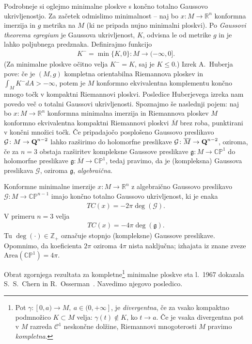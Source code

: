 \documentclass[12pt,a4paper,twoside]{article}
\theoremstyle{definition} %
\theoremstyle{plain} %
\numberwithin{equation}{section}  %
\newcommand{\R}{\mathbb R}
\newcommand{\Z}{\mathbb Z}
\begin{document}
Podrobneje si oglejmo minimalne ploskve s končno totalno Gaussovo ukrivljenostjo. Za začetek odmislimo minimalnost -- naj bo $x \colon M \to \R^{n}$ konformna imerzija in $g$ metrika na $M$ (ki ne pripada nujno minimalni ploskvi). Po \emph{Gaussovi theorema egregium} je Gaussova ukrivljenost, $K$, odvisna le od metrike $g$ in je lahko poljubnega predznaka. Definirajmo funkcijo
\begin{gather*}
K^{-} = \min \{K,0 \} \colon M \to (-\infty, 0].
\end{gather*}
(Za minimalne ploskve očitno velja $K^{-} = K$, saj je $K \leq 0$.)
%
Izrek A.~Huberja~\cite[Theorem~2.6.4]{alarcon2021minimal} pove: če je $(M,g)$ kompletna orientabilna Riemannova ploskev in $\int_{M} K^{-}dA > -\infty$, potem je $M$ konformno ekvivalentna komplementu končno mnogo točk v kompaktni Riemannovi ploskvi. \newline
Posledice Huberjevega izreka nam povedo več o totalni Gaussovi ukrivljenosti.
Spoznajmo še naslednji pojem: naj bo $x \colon M \to \R^{n}$ konformna minimalna imerzija in Riemannova ploskev $M$ konformno ekvivalentna kompaktni Riemannovi ploskvi $\overline{M}$ brez roba, punktirani v končni množici točk. 
Če pripadajočo posplošeno Gaussovo preslikavo $\mathcal{G} \colon M \to \textup{\textbf{Q}}^{n-2}$ lahko razširimo do holomorfne preslikave $\mathcal{G} \colon \overline{M} \to \textup{\textbf{Q}}^{n-2}$, oziroma, če za $n=3$ obstaja razširitev kompleksne Gaussove preslikave $\mathfrak{g} \colon M \to \mathbb{CP}^1$ do holomorfne preslikave $\mathfrak{g} \colon \overline{M} \to \mathbb{CP}^1$, tedaj pravimo, da je (kompleksna) Gaussova preslikava $\mathcal{G}$, oziroma $\mathfrak{g}$, \emph{algebraična}.

Konformne minimalne imerzije $x \colon M \to \R^{n}$ z algebraično Gaussovo preslikavo $\mathcal{G} \colon M \to \mathbb{CP}^{n-1}$ imajo končno totalno Gaussovo ukrivljenost, ki je enaka
\begin{gather}
TC(x) = -2\pi \deg(\mathcal{G}).
\end{gather}
V primeru $n=3$ velja
\begin{gather}
TC(x) = -4\pi \deg(\mathfrak{g}).
\end{gather}
Tu $\deg(\cdot) \in \Z_{+}$ označuje stopnjo (kompleksne) Gaussove preslikave. Opomnimo, da koeficienta $2\pi$ oziroma $4\pi$ nista naključna; izhajata iz znane zveze $\text{Area}(\mathbb{CP}^1) = 4\pi$.

Obrat zgornjega rezultata za kompletne\footnote{Pot $\gamma \colon [0,a) \to M, \ a \in (0,+\infty]$, je \emph{divergentna}, če za vsako kompaktno podmnožico $K \subset M$ velja: $\gamma(t) \notin K$, ko $t \to a$. Če je vsaka divergentna pot v $M$ razreda $\mathcal{C}^{1}$ neskončne dolžine, Riemannovi mnogoterosti $M$ pravimo \emph{kompletna}.} 
minimalne ploskve sta l.~1967 dokazala S.~S.~Chern in R.~Osserman~\cite[Theorem~2.6.7]{alarcon2021minimal}.
Navedimo njegovo posledico.
\end{document}

